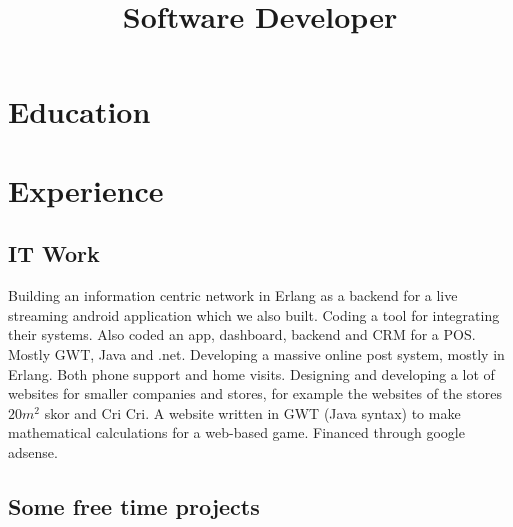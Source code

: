 \documentclass[11pt,a4paper]{moderncv}
\title{Software Developer}
\begin{document}
\maketitle
\section{\textbf{Education}}
\section{\textbf{Experience}}
\subsection{\textbf{IT Work}}
{Building an information centric network in Erlang as a backend for a live streaming android application which we also built.}
{Coding a tool for integrating their systems. Also coded an app, dashboard, backend and CRM for a POS. Mostly GWT, Java and .net.}
{Developing a massive online post system, mostly in Erlang.}
{Both phone support and home visits.}
{Designing and developing a lot of websites for smaller companies and stores, for example the websites of the stores \begin{math}20m^2\end{math} skor and Cri Cri.}
{A website written in GWT (Java syntax) to make mathematical calculations for a web-based game. Financed through google adsense.}
\newpage
\subsection{\textbf{Some free time projects}}
\end{document}
